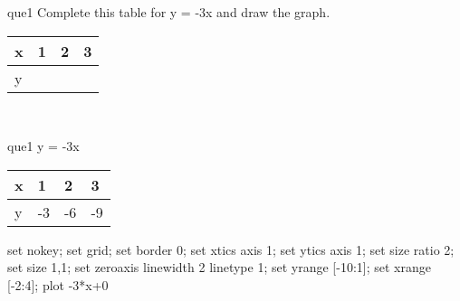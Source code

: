 \documentclass[13.5pt, varwidth=true]{beamer}
\begin{document}
\begin{frame}[shrink=19,fragile]
	\begin{beamercolorbox}[rounded=true, left, shadow=true,wd=14.8cm]{que1}
		 Complete this table for y = -3x and draw the graph. \\[0.3cm] \renewcommand{\arraystretch}{1.2}\begin{tabular}{|C|C|C|C|} \hline x & 1 & 2 & 3 \\ \hline y & & & \\ \hline \end{tabular}\\[0.3cm]
	\end{beamercolorbox}
\end{frame}
\begin{frame}[shrink=19,fragile]
	\begin{beamercolorbox}[rounded=true, left, shadow=true,wd=14.8cm]{que1}
		y = -3x\renewcommand{\arraystretch}{1.2}\begin{tabular}{|C|C|C|C|} \hline x & 1 & 2 & 3 \\ \hline y & -3 & -6 & -9\\ \hline \end{tabular}\begin{gnuplot}[terminal=pdf] set nokey; set grid; set border 0; set xtics axis 1; set ytics axis 1; set size ratio 2; set size 1,1; set zeroaxis linewidth 2 linetype 1; set yrange [-10:1]; set xrange [-2:4]; plot -3*x+0 \end{gnuplot}
	\end{beamercolorbox}
\end{frame}
\end{document}
